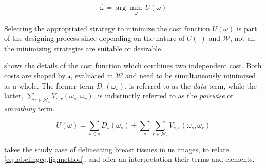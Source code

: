 \begin{equation}
\hat{\omega} = \arg \min_{\substack{\omega}} \,U(\omega)
\label{eq:costmin}
\end{equation}

Selecting the appropriated strategy to minimize the cost function $U(\omega)$ is part of the designing process since depending on the nature of $U(\cdot)$ and $\mathcal{W}$, not all the minimizing strategies are suitable or desirable.

 shows the details of the cost function which combines two independent cost.
Both costs are shaped by $\mathcal{s}$, evaluated in $\mathcal{W}$ and need to be simultaneously minimized as a whole.
The former term $D_s(\omega_s)$, is referred to as the \emph{data} term, while the latter, $\sum_{r \in \mathcal{N}_{s}} V_{s,r}(\omega_s,\omega_r)$, is indistinctly referred to as the \emph{pairwise} or \emph{smoothing} term.

\begin{equation}
  U(\omega) = \sum_{s\in s} D_s(\omega_s) + \sum_{s}\sum_{r \in \mathcal{N}_{s}} V_{s,r}(\omega_s,\omega_r)
  \label{eq:labelingeq}
\end{equation}

 takes the study case of delineating breast tissues in \ac{us} images, to relate \cref{eq:labelingeq,fig:method}, and offer an interpretation their terms and elements. 

